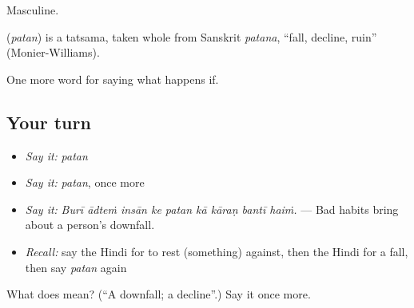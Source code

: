 Masculine.

\begin{cousinweb}
\textbf{} (\emph{patan}) is a tatsama, taken whole from Sanskrit \emph{patana}, \textquotedblleft{}fall, decline, ruin\textquotedblright{} (Monier-Williams).
\end{cousinweb}

\begin{grammarlens}[title={What you've built}]
One more word for saying what happens if.
\end{grammarlens}

\subsection*{Your turn}
\begin{itemize}
\raggedright
  \item \emph{Say it:} \emph{patan}
  \item \emph{Say it:} \emph{patan}, once more
  \item \emph{Say it:} \emph{Burī ādteṁ insān ke patan kā kāraṇ bantī haiṁ.} — Bad habits bring about a person's downfall.
  \item \emph{Recall:} say the Hindi for to rest (something) against, then the Hindi for a fall, then say \emph{patan} again
\end{itemize}

\begin{tcolorbox}[breakable,colback=teal!4,colframe=teal!35!black,title={Before you move on}]
What does  mean? (\textquotedblleft{}A downfall; a decline\textquotedblright{}.) Say it once more.
\end{tcolorbox}
